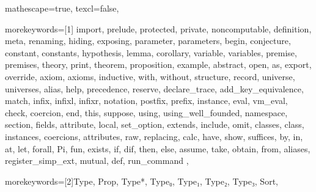 
 {

mathescape=true,
texcl=false,

morekeywords=[1]{
import, prelude, protected, private, noncomputable, definition, meta, renaming,
hiding, exposing, parameter, parameters, begin, conjecture, constant, constants,
hypothesis, lemma, corollary, variable, variables, premise, premises, theory,
print, theorem, proposition, example, abstract,
open, as, export, override, axiom, axioms, inductive, with, without,
structure, record, universe, universes,
alias, help, precedence, reserve, declare_trace, add_key_equivalence,
match, infix, infixl, infixr, notation, postfix, prefix, instance,
eval, vm_eval, check, coercion, end, this, suppose,
using, using_well_founded, namespace, section, fields,
attribute, local, set_option, extends, include, omit, classes, class,
instances, coercions, attributes, raw, replacing,
calc, have, show, suffices, by, in, at, let, forall, Pi, fun,
exists, if, dif, then, else, assume, take, obtain, from, aliases, register_simp_ext,
mutual, def, run_command
},

morekeywords=[2]{Type, Prop, Type*, Type₀, Type₁, Type₂, Type₃, Sort},



}
